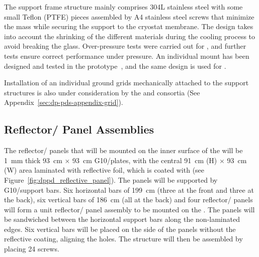 

The support frame structure mainly comprises \num{304}L stainless steel with some small Teflon (PTFE) pieces assembled by A4 stainless steel screws that minimize the mass while securing the  support to the cryostat membrane. The design %
takes into account the shrinking of the different materials during the cooling process to avoid breaking the  glass.
Over-pressure tests were carried out for , and further tests ensure correct performance under pressure. An individual  mount has been designed and tested in the   prototype~\cite{Zambelli:2017dkg}, and the same design is used for .

Installation of an individual ground grids mechanically attached to the  support structures is also under consideration by the  and \dual {} consortia (See Appendix~\ref{sec:dp-pds-appendix-grid}).


\subsection{Reflector/ Panel Assemblies}
\label{subsec:dp-pds-mechanics-reflectors}

The reflector/ panels that will be mounted on the inner surface of the  will be \SI{1}{\mm} thick \SI{93}{\cm} $\times$ \SI{93}{\cm} G10/\frfour plates, with the central \SI{91}{\cm} (H) $\times$ \SI{93}{\cm} (W) area laminated with reflective foil, which is coated with  (see Figure~\ref{fig:dppd_reflective_panel}). The panels will be supported by G10/\frfour support bars. Six horizontal bars of \SI{199}{\cm} (three at the front and three at the back), six vertical bars of \SI{186}{\cm} (all at the back) and four reflector/ panels will form a unit reflector/ panel assembly to be mounted on the . The panels will be sandwiched between the horizontal support bars along the non-laminated edges. Six vertical bars will be placed on the side of the panels without the reflective coating, aligning the holes. The structure will then be assembled by placing \num{24} screws.

